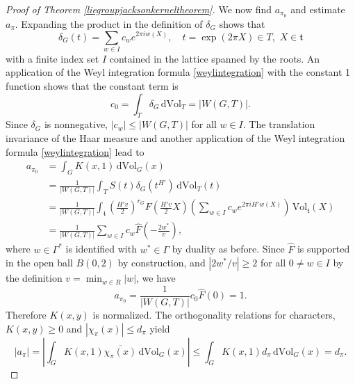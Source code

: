 \documentclass[11pt,a4paper]{article}
\theoremstyle{definition}
\begin{document}
\begin{proof}[Proof of Theorem \ref{liegroupjacksonkerneltheorem}]
We now find $a_{\pi_0}$ and estimate $a_{\pi}$. Expanding the product in the definition of $\delta_G$ shows that
\[ \delta_G (t) = \sum_{w \in I} c_w e^{2 \pi i w(X)}, \quad t=\exp (2 \pi X) \in T, \,\, X \in \mathfrak{t} \]
with a finite index set $I$ contained in the lattice spanned by the roots. An application of the Weyl integration formula \eqref{weylintegration} with the constant 1 function shows that the constant term is
\[ c_0 = \int_T \delta_G \, \mathrm{d}\mathrm{Vol}_T = |W(G,T)| . \]
Since $\delta_G$ is nonnegative, $|c_w| \le |W(G,T)|$ for all $w \in I$. The translation invariance of the Haar measure and another application of the Weyl integration formula \eqref{weylintegration} lead to
\[ \begin{split} a_{\pi_0} &= \int_G K(x,1) \, \mathrm{d}\mathrm{Vol}_G (x) \\ &= \frac{1}{|W(G,T)|} \int_T S(t) \delta_G (t^{H'}) \, \mathrm{d}\mathrm{Vol}_T (t) \\ &=\frac{1}{|W(G,T)|} \int_{\mathfrak{t}} \left( \frac{H'v}{2} \right)^{r_G} F \left( \frac{H' v}{2} X \right) \left( \sum_{w \in I} c_w e^{2 \pi i H' w(X)} \right) \, \mathrm{Vol}_{\mathfrak{t}}(X) \\ &= \frac{1}{|W(G,T)|} \sum_{w \in I} c_w \widehat{F} \left( - \frac{2w^*}{v} \right) , \end{split} \]
where $w \in \Gamma^*$ is identified with $w^* \in \Gamma$ by duality as before. Since $\widehat{F}$ is supported in the open ball $B(0,2)$ by construction, and $|2w^*/v| \ge 2$ for all $0 \neq w \in I$ by the definition $v=\min_{w \in R} |w|$, we have
\[ a_{\pi_0} = \frac{1}{|W(G,T)|} c_0 \widehat{F}(0)=1 . \]
Therefore $K(x,y)$ is normalized. The orthogonality relations for characters, $K(x,y) \ge 0$ and $|\chi_{\pi} (x)| \le d_{\pi}$ yield
\begin{equation}\label{apibound}
|a_{\pi}| = \left| \int_G K(x,1) \overline{\chi_{\pi}(x)} \, \mathrm{d}\mathrm{Vol}_G (x) \right| \le \int_G K(x,1) d_{\pi} \, \mathrm{d}\mathrm{Vol}_G (x) = d_{\pi} .
\end{equation}


\end{proof}
\end{document}
